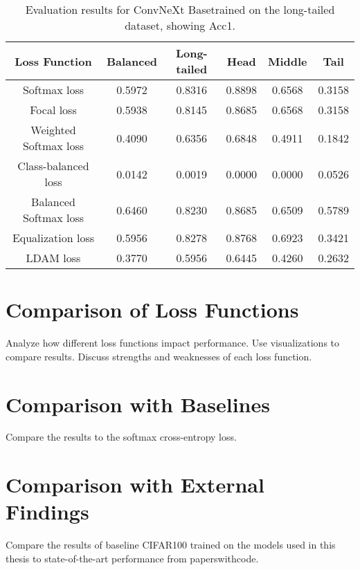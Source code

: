 \begin{table}[h!]
    \centering
    \begin{tabular}{cccccc}
        \toprule
        Loss Function & Balanced & Long-tailed & Head & Middle & Tail \\ 
        \midrule
        Softmax loss   & 0.5972 & 0.8316 & 0.8898 & 0.6568 & 0.3158 \\
        Focal loss   & 0.5938 & 0.8145 & 0.8685 & 0.6568 & 0.3158 \\
        Weighted Softmax loss   & 0.4090 & 0.6356 & 0.6848 & 0.4911 & 0.1842 \\
        Class-balanced loss   & 0.0142 & 0.0019 & 0.0000 & 0.0000 & 0.0526 \\
        Balanced Softmax loss   & 0.6460 & 0.8230 & 0.8685 & 0.6509 & 0.5789 \\
        Equalization loss   & 0.5956 & 0.8278 & 0.8768 & 0.6923 & 0.3421 \\
        LDAM loss   & 0.3770 & 0.5956 & 0.6445 & 0.4260 & 0.2632 \\
        \bottomrule
    \end{tabular}
    \caption{Evaluation results for ConvNeXt Basetrained on the long-tailed dataset, showing Acc1.}
    \label{tab:conv_lt_acc1_1}
\end{table}




\section{Comparison of Loss Functions}
Analyze how different loss functions impact performance.
Use visualizations to compare results.
Discuss strengths and weaknesses of each loss function.

\section{Comparison with Baselines}
Compare the results to the softmax cross-entropy loss.

\section{Comparison with External Findings}
Compare the results of baseline CIFAR100 trained on the models used in this thesis to state-of-the-art performance from paperswithcode.

